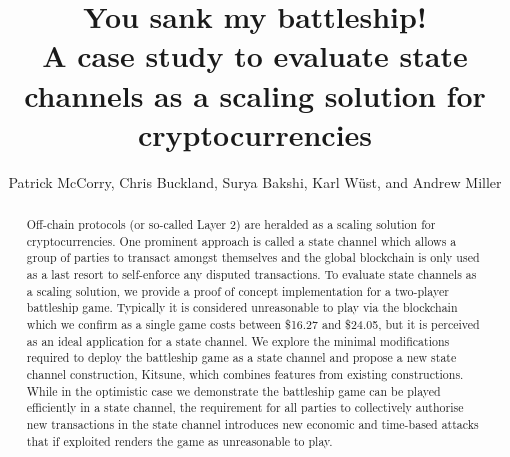 \documentclass{llncs}
\begin{document}
	
	\title{You sank my battleship! \\ A case study to evaluate state channels as a scaling solution for cryptocurrencies}
	
	
		\author{Patrick McCorry, Chris Buckland,
			Surya Bakshi, Karl W\"ust, and Andrew Miller }
		
	
	\maketitle
	\begin{abstract}
		Off-chain protocols (or so-called Layer 2) are heralded as a scaling solution for cryptocurrencies.
		One prominent approach is called a state channel which allows a group of parties to transact amongst themselves and the global blockchain is only used as a last resort to self-enforce any disputed transactions. 
		To evaluate state channels as a scaling solution, we provide a proof of concept implementation for a two-player battleship game.
		Typically it is considered unreasonable to play via the blockchain which we confirm as a single game costs between \$16.27 and \$24.05, but it is perceived as an ideal application for a state channel. 
		We explore the minimal modifications required to deploy the battleship game as a state channel and propose a new state channel construction, \textsf{Kitsune}, which combines features from existing constructions. 
		While in the optimistic case we demonstrate the battleship game can be played efficiently in a state channel, the requirement for all parties to collectively authorise new transactions in the state channel introduces new economic and time-based attacks that if exploited renders the game as unreasonable to play. 
	\end{abstract} 
	
\end{document}
